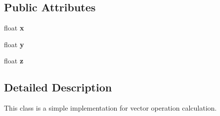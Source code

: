 \subsection*{Public Attributes}
\begin{DoxyCompactItemize}
\item 
\hypertarget{classVector3D_aca5d15bdb846448e3cb73b072783f329}{
float {\bfseries x}}
\label{classVector3D_aca5d15bdb846448e3cb73b072783f329}

\item 
\hypertarget{classVector3D_a9b6d194fcf526d7d4f9e902421285e94}{
float {\bfseries y}}
\label{classVector3D_a9b6d194fcf526d7d4f9e902421285e94}

\item 
\hypertarget{classVector3D_af9728f1eba23b9ee091755346214f391}{
float {\bfseries z}}
\label{classVector3D_af9728f1eba23b9ee091755346214f391}

\end{DoxyCompactItemize}


\subsection{Detailed Description}
This class is a simple implementation for vector operation calculation. 

